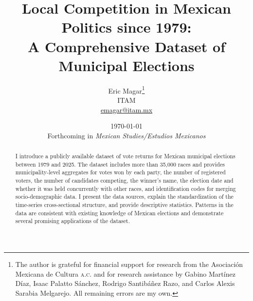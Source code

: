 \documentclass[letter,12pt]{article}
\begin{document}
\title{Local Competition in Mexican Politics since 1979: \\ A Comprehensive Dataset of Municipal Elections}
\author{Eric Magar\footnote{The author is grateful for financial support for research from the Asociación Mexicana de Cultura \textsc{a.c.} and for research assistance by Gabino Martínez Díaz, Isaac Palatto Sánchez, Rodrigo Santibáñez Razo, and Carlos Alexis Sarabia Melgarejo. All remaining errors are my own.} \\ ITAM \\ \url{emagar@itam.mx}}
\date{\today  \\ Forthcoming in \emph{Mexican Studies/Estudios Mexicanos}}
\maketitle

\begin{abstract}
\noindent I introduce a publicly available dataset of vote returns for Mexican municipal elections between 1979 and 2025. The dataset includes more than 35,000 races and provides municipality-level aggregates for votes won by each party, the number of registered voters, the number of candidates competing, the winner's name, the election date and whether it was held concurrently with other races, and identification codes for merging socio-demographic data. I present the data sources, explain the standardization of the time-series cross-sectional structure, and provide descriptive statistics. Patterns in the data are consistent with existing knowledge of Mexican elections and demonstrate several promising applications of the dataset.
\end{abstract}

\end{document}
